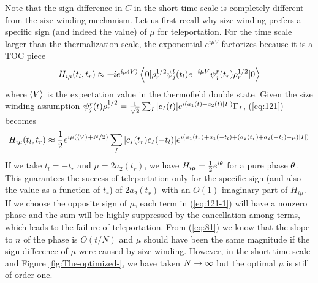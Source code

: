 \documentclass[11pt]{article}
\renewcommand{\>}{\rangle}
\newcommand{\<}{\langle}
\begin{document}
Note that the sign difference in $C$ in the short time scale is completely
different from the size-winding mechanism. Let us first recall why
size winding prefers a specific sign (and indeed the value) of $\mu$
for teleportation. For the time scale larger than the thermalization
scale, the exponential $e^{i\mu V}$ factorizes because it is a TOC
piece \cite{Maldacena:2017axo}
\begin{equation}
H_{i\mu}(t_{l},t_{r})\approx-ie^{i\mu\left\langle V\right\rangle}\left\langle 0|\rho_{r}^{1/2}\psi_{j}^{l}(t_{l})e^{-i\mu V}\psi_{j}^{r}(t_{r})\rho_{r}^{1/2}|0\right\rangle\label{eq:121}
\end{equation}
where $\left\langle V\right\rangle$ is the expectation value in the thermofield double
state. Given the size winding assumption $\psi_{j}^{r}(t)\rho_{r}^{1/2}=\frac{1}{\sqrt{2}}\sum_{I}|c_{I}(t)|e^{i(a_{1}(t)+a_{2}(t)|I|)}\Gamma_{I}$,
(\ref{eq:121}) becomes
\begin{equation}
H_{i\mu}(t_{l},t_{r})\approx\frac{1}{2}e^{i\mu(\left\langle V\right\rangle+N/2)}\sum_{I}|c_{I}(t_{r})c_{I}(-t_{l})|e^{i(a_{1}(t_{r})+a_{1}(-t_{l})+(a_{2}(t_{r})+a_{2}(-t_{l})-\mu)|I|)}\label{eq:121-1}
\end{equation}
If we take $t_{l}=-t_{r}$ and $\mu=2a_{2}(t_{r})$, we have $H_{i\mu}=\frac{1}{2}e^{i\theta}$
for a pure phase $\theta$. This guarantees the success of teleportation
only for the specific sign (and also the value as a function of $t_{r}$)
of $2a_{2}(t_{r})$ with an $O(1)$ imaginary part of $H_{i\mu}$.
If we choose the opposite sign of $\mu$, each term in (\ref{eq:121-1})
will have a nonzero phase and the sum will be highly suppressed by
the cancellation among terms, which leads to the failure of teleportation.
From (\ref{eq:81}) we know that the slope to $n$ of the phase is
$O(t/N)$ and $\mu$ should have been the same magnitude if the sign
difference of $\mu$ were caused by size winding. However, in the
short time scale and Figure \ref{fig:The-optimized-}, we have taken
$N\rightarrow\infty$ but the optimal $\mu$ is still of order one.
\end{document}
